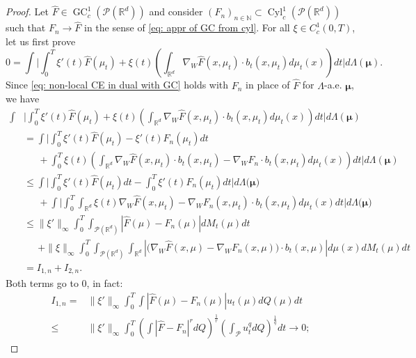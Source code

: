\documentclass[10pt,leqno]{amsart}
\numberwithin{equation}{section}
\newcommand{\R}{\mathbb{R}}
\newcommand{\Q}{\mathbb{Q}}
\newcommand{\N}{\mathbb{N}}
\newcommand{\PP}{\mathcal{P}}
\renewcommand{\Q}{Q}
\begin{document}
\begin{proof}
Let $\hat{F} \in\operatorname{GC}_c^1(\PP(\R^d))$ and consider $(F_n)_{n\in \N}\subset \operatorname{Cyl}_c^1(\PP(\R^d))$ such that $F_n {\longrightarrow} \hat{F}$ in the sense of \eqref{eq: appr of GC from cyl}. For all $\xi \in C_c^1(0,T)$, let us first prove
\begin{equation}\label{eq: proof}
    0 = \int \bigg| \int_0^T \xi'(t)\hat{F}(\mu_t) + \xi(t)\left(\int_{\R^d} \nabla_W \hat{F}(x,\mu_t) \cdot b_t(x,\mu_t) d\mu_t(x) \right) dt \bigg| d\Lambda(\boldsymbol{\mu}).
\end{equation}
Since \eqref{eq: non-local CE in dual with GC} holds with $F_n$ in place of $\hat{F}$ for $\Lambda$-a.e. $\boldsymbol{\mu}$, we have 
\begin{align*}
     \int & \bigg| \int_0^T \xi'(t)\hat{F}(\mu_t) + \xi(t)\left(\int_{\R^d} \nabla_W \hat{F}(x,\mu_t) \cdot b_t(x,\mu_t) d\mu_t(x) \right) dt \bigg| d\Lambda(\boldsymbol{\mu})
     \\
     & = \int \bigg| \int_0^T \xi'(t)\hat{F}(\mu_t) - \xi'(t)F_n(\mu_t) dt
     \\
     & \quad \ \  + \int_0^T \xi(t)\left(\int_{\R^d} \nabla_W \hat{F}(x,\mu_t) \cdot b_t(x,\mu_t) - \nabla_W F_n\cdot b_t(x,\mu_t) d\mu_t(x) \right) dt \bigg| d\Lambda(\boldsymbol{\mu})
     \\
     & \leq \int  \bigg|
        \int_0^T  \xi'(t)\hat{F}(\mu_t) dt - \int_0^T \xi'(t)F_n(\mu_t) dt
        \bigg| d\Lambda\big(\boldsymbol{\mu}\big)
        \\
        & \quad \ \ + \int \bigg|  \int_0^T \int_{\R^d}\xi(t)\nabla_W \hat{F}(x,\mu_t) - \nabla_W F_n(x,\mu_t)\cdot b_t(x,\mu_t)d\mu_t(x) dt  \bigg|d\Lambda\big(\boldsymbol{\mu}\big)
        \\
        & \leq \|\xi'\|_\infty\int_0^T \int_{\PP(\R^d)} |\hat{F}(\mu)-F_n(\mu)| dM_t(\mu) dt
        \\
        & \quad \ \ + \|\xi\|_\infty
        \int_0^T \int_{\PP(\R^d)} \int_{\R^d} \left|\Big( \nabla_W \hat{F}(x,\mu)-\nabla_W F_n(x,\mu) \Big)\cdot b_t(x,\mu) \right|d\mu(x) dM_t(\mu)dt
        \\
        & = I_{1,n} + I_{2,n}.
\end{align*}
Both terms go to $0$, in fact:
\begin{align*}
    I_{1,n} = & \|\xi'\|_\infty
        \int_0^T \int |\hat{F}(\mu)- F_n(\mu)|u_t(\mu) d\Q(\mu) dt 
        \\
        \leq &
        \lVert \xi' \rVert_{\infty} \int_0^T\left(\int |\hat{F}-F_n |^r d\Q\right)^{\frac{1}{r}} \left( \int_\PP u_t^q  d\Q\right)^{\frac{1}{q}}dt \to 0;
\end{align*}


\end{proof}
\end{document}
